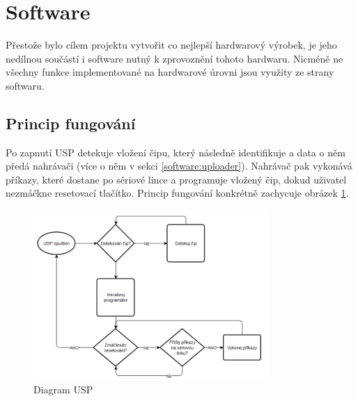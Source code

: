 \documentclass[11pt,a4paper,twoside,openright]{report}
\begin{document}




\pagebreak
\section {Software}

Přestože bylo cílem projektu vytvořit co nejlepší hardwarový výrobek, je jeho nedílnou součástí i software nutný k zprovoznění tohoto hardwaru. Nicméně ne všechny funkce implementované na hardwarové úrovni jsou využity ze strany softwaru. 

\subsection{Princip fungování}

Po zapnutí USP detekuje vložení čipu, který následně identifikuje a data o něm předá nahrávači (více o něm v sekci \ref{software:uploader}). Nahrávač pak vykonává příkazy, které dostane po sériové lince a programuje vložený čip, dokud uživatel nezmáčkne resetovací tlačítko. Princip fungování konkrétně zachycuje obrázek \ref{fig:app_diagram}. 

\begin{figure}[ht!]
  \includegraphics[width=0.8\textwidth]{img/app_diagram.png}
  \centering
  \caption{Diagram USP}
  \label{fig:app_diagram}
\end{figure}
\end{document}
